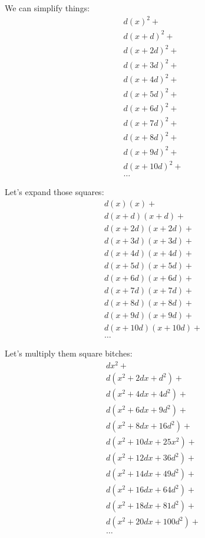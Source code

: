 \documentclass{report}
\begin{document}
We can simplify things:
\[\begin{split}
  d(x)^2 + \\
  d(x+d)^2 + \\
  d(x+2d)^2 + \\
  d(x+3d)^2 + \\
  d(x+4d)^2 + \\
  d(x+5d)^2 + \\
  d(x+6d)^2 + \\
  d(x+7d)^2 + \\
  d(x+8d)^2 + \\
  d(x+9d)^2 + \\
  d(x+10d)^2 + \\
  \ldots
\end{split}\]

Let's expand those squares:
\[\begin{split}
  d(x)(x) + \\
  d(x+d)(x+d) + \\
  d(x+2d)(x+2d) + \\
  d(x+3d)(x+3d) + \\
  d(x+4d)(x+4d) + \\
  d(x+5d)(x+5d) + \\
  d(x+6d)(x+6d) + \\
  d(x+7d)(x+7d) + \\
  d(x+8d)(x+8d) + \\
  d(x+9d)(x+9d) + \\
  d(x+10d)(x+10d) + \\
  \ldots
\end{split}\]

Let's multiply them square bitches:
\[\begin{split}
  dx^2 + \\
  d(x^2 + 2dx + d^2) + \\
  d(x^2 + 4dx + 4d^2) + \\
  d(x^2 + 6dx + 9d^2) + \\
  d(x^2 + 8dx + 16d^2) + \\
  d(x^2 + 10dx + 25x^2) + \\
  d(x^2+12dx   +36d^2) + \\
  d(x^2+14dx   +49d^2) + \\
  d(x^2+16dx   +64d^2) + \\
  d(x^2+18dx   +81d^2) + \\
  d(x^2+20dx   +100d^2) + \\
  \ldots
\end{split}\]
\end{document}
